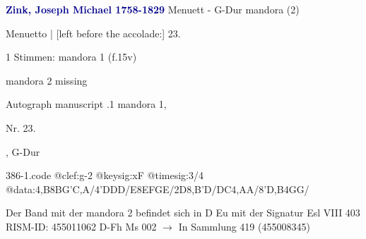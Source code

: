 \documentclass[twocolumn]{book}
\begin{document}
\newline \par \vspace{7pt} \textcolor{darkblue}{\textbf{Zink, Joseph Michael  1758-1829}}
\newline Menuett - G-Dur
\newline mandora (2)
\newline \begin{itshape}[f.15v, at left:] Menuetto | [left before the accolade:] 23.\end{itshape} 
\newline \textcolor{darkblue}{}  1 Stimmen: mandora 1  (f.15v)
\newline \begin{small} mandora 2 missing\end{small} 
\newline Autograph manuscript
.1  mandora 1, \begin{itshape}Nr. 23.\end{itshape}, G-Dur  
\begin{filecontents*}{386-1.code}
@clef:g-2
@keysig:xF
@timesig:3/4
@data:4,B8BG'C,A/4'DDD/E8EFGE/2D{8,B'D}/{DC}4,AA/8'D,B4GG/
\end{filecontents*}
\newline
%
\newline Der Band mit der mandora 2 befindet sich in D Eu mit der Signatur Esl VIII 403
\newline RISM-ID: 455011062
\newline D-Fh  Ms 002
\newline $\rightarrow$ In Sammlung 419 (455008345)
      
\end{document}
